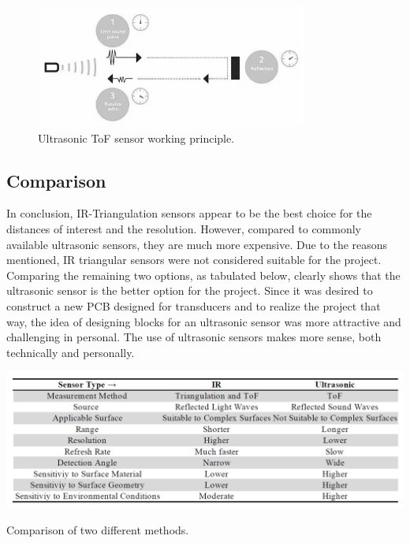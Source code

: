 \documentclass[12pt, a4paper]{article}
\begin{document}
            \begin{figure}[H]\centering
                \includegraphics[width=0.8\textwidth]{ultrasonic.png}
                \caption[]{Ultrasonic ToF sensor working principle.\cite{tof}}\label{fig:ultrasonic}
            \end{figure}



        \pagebreak
        \subsection{Comparison}
            In conclusion, IR-Triangulation sensors appear to be the best choice for the distances of interest and the resolution. However, compared to commonly available ultrasonic sensors, they are much more expensive. Due to the reasons mentioned, IR triangular sensors were not considered suitable for the project. Comparing the remaining two options, as tabulated below, clearly shows that the ultrasonic sensor is the better option for the project. Since it was desired to construct a new PCB designed for transducers and to realize the project that way, the idea of designing blocks for an ultrasonic sensor was more attractive and challenging  in personal. The use of ultrasonic sensors makes more sense, both technically and personally.

            \begin{table}[H]\centering
                \includegraphics[width=\textwidth]{comparison.png}
                \caption[]{Comparison of two different methods.}\label{tab:comparison}
            \end{table}
\end{document}
